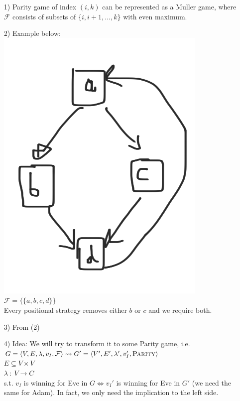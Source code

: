 \begin{itemize}
	\item[1)] Parity game of index $(i, k)$ can be represented as a Muller game, where $\mathcal{F}$ consists
	of subsets of $\{i, i+1, ..., k\}$ with even maximum.
	\item[2)] Example below:\\
	\includegraphics[scale=0.1]{content/graphics/game6}\\
	$\mathcal{F} = \{\{a, b, c, d\}\}$\\
	Every positional strategy removes either $b$ or $c$ and we require both.
	\item[3)] From (2)
	\item[4)] Idea: We will try to transform it to some Parity game, i.e.\\
	$G = \langle V, E, \lambda, v_I, \mathcal{F} \rangle \rightsquigarrow G^\prime = \langle V^\prime, E^\prime, \lambda^\prime, v_I^\prime, \textsc{Parity} \rangle$\\
	$E \subseteq V \times V$\\
	$\lambda\ :\ V \rightarrow C$\\
	s.t. $v_I$ is winning for Eve in $G \Leftrightarrow v_I'$ is winning for Eve in $G'$ (we need the same for Adam).
	In fact, we only need the implication to the left side.
\end{itemize}

